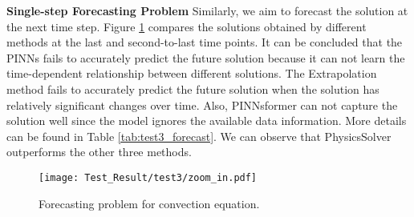 \documentclass[preprint,11pt]{elsarticle}
\begin{document}
\textbf{Single-step Forecasting Problem }
Similarly, we aim to forecast the solution at the next time step. Figure \ref{fig:test3_forecast} compares the solutions obtained by different methods at the last and second-to-last time points. It can be concluded that the PINNs fails to accurately predict the future solution because it can not learn the time-dependent relationship between different solutions. The Extrapolation method fails to accurately predict the future solution when the solution has relatively significant changes over time. Also, PINNsformer can not capture the solution well since the model ignores the available data information. More details can be found in Table  \ref{tab:test3_forecast}. We can observe that PhysicsSolver outperforms the other three methods. 
\begin{figure}[h]
\centering
\hspace{-0.9cm}\texttt{[image: Test\_Result/test3/zoom\_in.pdf]}
    \caption{Forecasting problem for convection equation.}
    \label{fig:test3_forecast}
\end{figure}
\begin{table}[H]
\vspace{-15pt}
    
	\vskip 0.1in
	\centering
	\begin{small}
		\begin{sc}
			\renewcommand{\multirowsetup}{\centering}
			\setlength{\tabcolsep}{5.5pt}
		\end{sc}
	\end{small}
    \caption{Relative $l^2$ errors.}
	\label{tab:test3_forecast}
\end{table}
\end{document}
